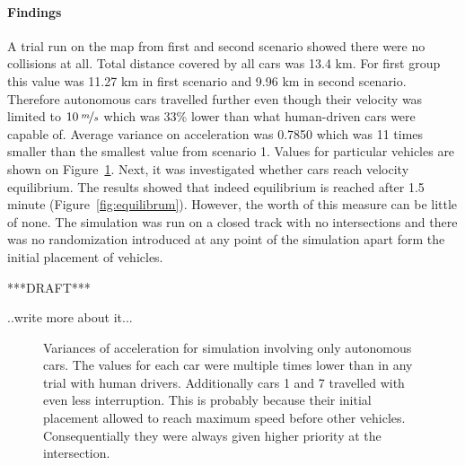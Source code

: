 \documentclass[11pt,english]{article}
\begin{document}
\paragraph{Findings}

A trial run on the map from first and second scenario showed there were no collisions at all. Total distance covered by all cars was 13.4 km. For first group this value was 11.27 km in first scenario and 9.96 km in second scenario. Therefore autonomous cars travelled further even though their velocity was limited to $10\:\nicefrac{m}{s}$ which was 33\% lower than what human-driven cars were capable of. Average variance on acceleration was 0.7850 which was 11 times smaller than the smallest value from scenario 1. Values for particular vehicles are shown on Figure~\ref{fig:acc_autonomous_only_var}. Next, it was investigated whether cars reach velocity equilibrium. The results showed that indeed equilibrium is reached after 1.5 minute (Figure~\ref{fig:equilibrum}). However, the worth of this measure can be little of none. The simulation was run on a closed track with no intersections and there was no randomization introduced at any point of the simulation apart form the initial placement of vehicles.

***DRAFT***

..write more about it...

\begin{figure}[!] %
\caption{Variances of acceleration for simulation involving only autonomous cars. The values for each car were multiple times lower than in any trial with human drivers. Additionally cars 1 and 7 travelled with even less interruption. This is probably because their initial placement allowed to reach maximum speed before other vehicles. Consequentially they were always given higher priority at the intersection.}
\label{fig:acc_autonomous_only_var}
\end{figure} 
\end{document}
